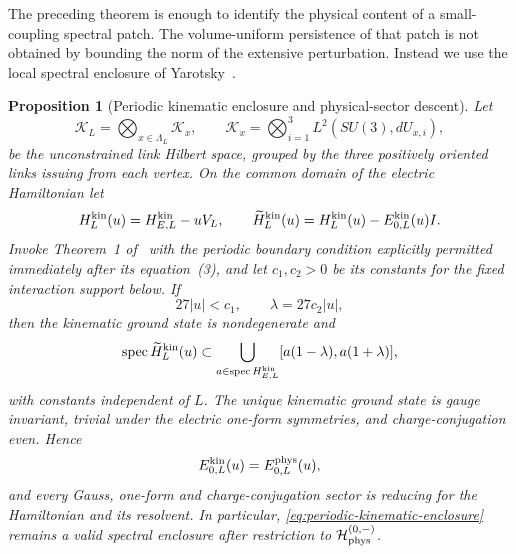 \documentclass[11pt]{article}
\theoremstyle{plain}
\newtheorem{proposition}[theorem]{Proposition}
\theoremstyle{definition}
\theoremstyle{remark}
\begin{document}
The preceding theorem is enough to identify the physical content of a
small-coupling spectral patch. The volume-uniform persistence of that patch is
not obtained by bounding the norm of the extensive perturbation. Instead we
use the local spectral enclosure of Yarotsky~\cite{Yarotsky2004QP}.

\begin{proposition}[Periodic kinematic enclosure and physical-sector descent]
\label{prop:periodic-yarotsky-descent}
Let
\[
 \mathcal K_L=\bigotimes_{x\in\Lambda_L}\mathcal K_x,
 \qquad
 \mathcal K_x=\bigotimes_{i=1}^3L^2\!\left(SU(3),dU_{x,i}\right),
\]
be the unconstrained link Hilbert space, grouped by the three positively
oriented links issuing from each vertex.  On the common domain of the electric
Hamiltonian let
\[
 H_L^{\rm kin}(u)=H_{E,L}^{\rm kin}-uV_L,
 \qquad
 \widetilde H_L^{\rm kin}(u)
 =H_L^{\rm kin}(u)-E_{0,L}^{\rm kin}(u)I .
\]
Invoke Theorem~1 of~\cite{Yarotsky2004QP} with the periodic boundary
condition explicitly permitted immediately after its equation~(3), and let
$c_1,c_2>0$ be its constants for the fixed interaction support below.  If
\[
 27|u|<c_1,\qquad \lambda=27c_2|u|,
\]
then the kinematic ground state is nondegenerate and
\begin{equation}\label{eq:periodic-kinematic-enclosure}
 \operatorname{spec}\widetilde H_L^{\rm kin}(u)
 \subset
 \bigcup_{a\in\operatorname{spec}H_{E,L}^{\rm kin}}
 [a(1-\lambda),a(1+\lambda)] ,
\end{equation}
with constants independent of $L$.  The unique kinematic ground state is
gauge invariant, trivial under the electric one-form symmetries, and
charge-conjugation even.  Hence
\[
 E_{0,L}^{\rm kin}(u)=E_{0,L}^{\rm phys}(u),
\]
and every Gauss, one-form and charge-conjugation sector is reducing for the
Hamiltonian and its resolvent.  In particular,
\eqref{eq:periodic-kinematic-enclosure} remains a valid spectral enclosure
after restriction to $\mathcal H_{\rm phys}^{(0,-)}$.
\end{proposition}
\end{document}
